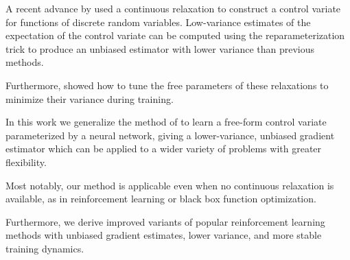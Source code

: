 \documentclass{article}
\begin{document}
A recent advance by \citet{tucker2017rebar} used a continuous relaxation to construct a control variate for functions of discrete random variables. Low-variance estimates of the expectation of the control variate can be computed using the reparameterization trick to produce an unbiased estimator with lower variance than previous methods.

Furthermore, \citet{tucker2017rebar} showed how to tune the free parameters of these relaxations to minimize their variance during training.

In this work we generalize the method of \citet{tucker2017rebar} to learn a free-form control variate parameterized by a neural network, giving a lower-variance, unbiased gradient estimator which can be applied to a wider variety of problems with greater flexibility.
 
Most notably, our method is applicable even when no continuous relaxation is available, as in reinforcement learning or black box function optimization.

Furthermore, we derive improved variants of popular reinforcement learning methods with unbiased gradient estimates, lower variance, and more stable training dynamics.

\end{document}
